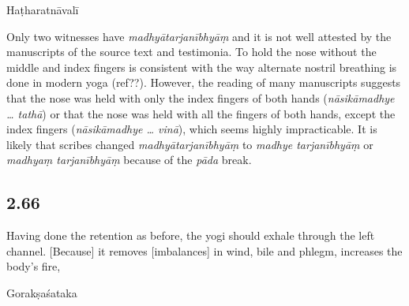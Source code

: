 \begin{ekdosis}
\begin{testimonia}[hp02_065]
\begin{versinnote}
\end{versinnote}

Haṭharatnāvalī

\begin{versinnote}
\tl{dhārayen nāsikāṃ madhyātarjanībhyāṃ vinā dṛḍham |
\var{23c madhyā ] madhye vl}\\!}
\end{versinnote}
\end{testimonia}

\begin{philcomm}[hp02_065]
Only two witnesses have \emph{madhyātarjanībhyāṃ} and it is not well attested by the manuscripts of the source text and testimonia. To hold the nose without the middle and index fingers is consistent with the way alternate nostril breathing is done in modern yoga (ref??). However, the reading of many manuscripts suggests that the nose was held with only the index fingers of both hands (\emph{nāsikāmadhye … tathā}) or that the nose was held with all the fingers of both hands, except the index fingers (\emph{nāsikāmadhye … vinā}), which seems highly impracticable. It is likely that scribes changed \emph{madhyātarjanībhyāṃ} to \emph{madhye tarjanībhyāṃ} or \emph{madhyaṃ tarjanībhyāṃ} because of the \emph{pāda} break. 
\end{philcomm}

\subsection*{2.66}
\begin{translation}[hp02_066]
Having done the retention as before, the yogi should exhale through the left channel. [Because] it removes [imbalances] in wind, bile and phlegm, increases the body’s fire,

\end{translation}

\begin{sources}[hp02_066]
Gorakṣaśataka

\begin{versinnote}
\end{versinnote}
\end{sources}


\end{ekdosis}
